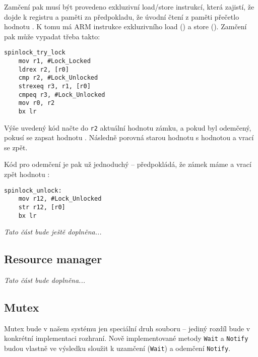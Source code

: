 \documentclass{article}
\begin{document}
Zamčení pak musí být provedeno exkluzivní load/store instrukcí, která zajistí, že dojde k  registru a paměti za předpokladu, že úvodní čtení z paměti přečetlo hodnotu . K tomu má ARM instrukce exkluzivního load () a store (). Zamčení pak může vypadat třeba takto:
\begin{lstlisting}
spinlock_try_lock
	mov r1, #Lock_Locked
	ldrex r2, [r0]
	cmp r2, #Lock_Unlocked
	strexeq r3, r1, [r0]
	cmpeq r3, #Lock_Unlocked
	mov r0, r2
	bx lr
\end{lstlisting}
Výše uvedený kód načte do \texttt{r2} aktuální hodnotu zámku, a pokud byl odemčený, pokusí se zapsat hodnotu . Následně porovná starou hodnotu s hodnotou  a vrací se zpět.

Kód pro odemčení je pak už jednoduchý -- předpokládá, že zámek máme a vrací zpět hodnotu :
\begin{lstlisting}
spinlock_unlock:
	mov r12, #Lock_Unlocked
	str r12, [r0]
	bx lr
\end{lstlisting}

\emph{Tato část bude ještě doplněna...}

\subsection{Resource manager}

\emph{Tato část bude doplněna...}

\subsection{Mutex}

Mutex bude v našem systému jen speciální druh souboru -- jediný rozdíl bude v konkrétní implementaci rozhraní. Nově implementované metody \texttt{Wait} a \texttt{Notify} budou vlastně ve výsledku sloužit k uzamčení (\texttt{Wait}) a odemčení \texttt{Notify}.
\end{document}
